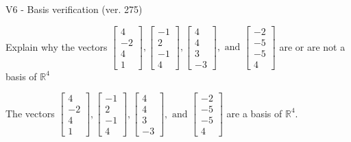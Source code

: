 \begin{exercise}
  \begin{exerciseTitle}V6 - Basis verification (ver. 275)\end{exerciseTitle}
  \begin{exerciseStatement}
    Explain why the vectors \(\left[\begin{array}{r}
4 \\
-2 \\
4 \\
1
\end{array}\right] , \left[\begin{array}{r}
-1 \\
2 \\
-1 \\
4
\end{array}\right] , \left[\begin{array}{r}
4 \\
4 \\
3 \\
-3
\end{array}\right] , \text{ and } \left[\begin{array}{r}
-2 \\
-5 \\
-5 \\
4
\end{array}\right]\) are or are not a basis of \(\mathbb{R}^4\)	


  \end{exerciseStatement}
  \begin{exerciseAnswer}
   The vectors \(\left[\begin{array}{r}
4 \\
-2 \\
4 \\
1
\end{array}\right] , \left[\begin{array}{r}
-1 \\
2 \\
-1 \\
4
\end{array}\right] , \left[\begin{array}{r}
4 \\
4 \\
3 \\
-3
\end{array}\right] , \text{ and } \left[\begin{array}{r}
-2 \\
-5 \\
-5 \\
4
\end{array}\right]\) 
  	 are  a basis of \(\mathbb{R}^4\).
  


  \end{exerciseAnswer}
\end{exercise}